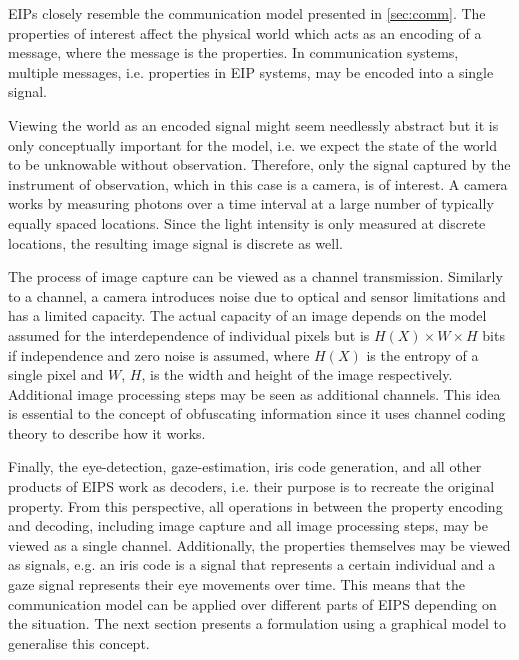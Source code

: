 EIPs closely resemble the communication model presented in \cref{sec:comm}. The properties of interest affect the physical world which acts as an encoding of a message, where the message is the properties. In communication systems, multiple messages, i.e. properties in EIP systems, may be encoded into a single signal. 


Viewing the world as an encoded signal might seem needlessly abstract but it is only conceptually important for the model, i.e. we expect the state of the world to be unknowable without observation. Therefore, only the signal captured by the instrument of observation, which in this case is a camera, is of interest. A camera works by measuring photons over a time interval at a large number of typically equally spaced locations. Since the light intensity is only measured at discrete locations, the resulting image signal is discrete as well. 

The process of image capture can be viewed as a channel transmission. Similarly to a channel, a camera introduces noise due to optical and sensor limitations and has a limited capacity. The actual capacity of an image depends on the model assumed for the interdependence of individual pixels but is $H(X)\times W\times H$ bits if independence and zero noise is assumed, where $H(X)$ is the entropy of a single pixel and $W$, $H$, is the width and height of the image respectively. Additional image processing steps may be seen as additional channels. This idea is essential to the concept of obfuscating information since it uses channel coding theory to describe how it works. 

Finally, the eye-detection, gaze-estimation, iris code generation, and all other products of EIPS work as decoders, i.e. their purpose is to recreate the original property. From this perspective, all operations in between the property encoding and decoding, including image capture and all image processing steps, may be viewed as a single channel. Additionally, the properties themselves may be viewed as signals, e.g. an iris code is a signal that represents a certain individual and a gaze signal represents their eye movements over time. This means that the communication model can be applied over different parts of EIPS depending on the situation. The next section presents a formulation using a graphical model to generalise this concept.


